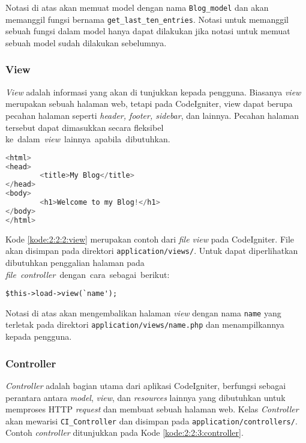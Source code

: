 Notasi di atas akan memuat model dengan nama \verb|Blog_model| dan akan memanggil fungsi bernama \verb|get_last_ten_entries|. Notasi untuk memanggil sebuah fungsi dalam model hanya dapat dilakukan jika notasi untuk memuat sebuah model sudah dilakukan sebelumnya.

\subsubsection{View}
\label{sub:2:2:2:View}

\textit{View} adalah informasi yang akan di tunjukkan kepada pengguna. Biasanya \textit{view} merupakan sebuah halaman web, tetapi pada CodeIgniter, view dapat berupa pecahan halaman seperti \textit{header, footer, sidebar}, dan lainnya. Pecahan halaman tersebut dapat dimasukkan secara fleksibel \mbox{ke dalam \textit{view} lainnya apabila dibutuhkan.}

\begin{lstlisting}[language=php, caption={Contoh \textit{view}}, label={kode:2:2:2:view}]
<html>
<head>
        <title>My Blog</title>
</head>
<body>
        <h1>Welcome to my Blog!</h1>
</body>
</html>
\end{lstlisting}

Kode \ref{kode:2:2:2:view} merupakan contoh dari \textit{file view} pada CodeIgniter. File akan disimpan pada direktori \verb|application/views/|. Untuk dapat diperlihatkan dibutuhkan penggalian halaman pada \mbox{\textit{file controller} dengan cara sebagai berikut:}

\begin{center}
	\verb|$this->load->view(`name');|
\end{center}

Notasi di atas akan mengembalikan halaman \textit{view} dengan nama \verb|name| yang terletak pada direktori \verb|application/views/name.php| dan menampilkannya kepada pengguna.

\subsubsection{Controller}
\label{sub:2:2:3:Controller}

\textit{Controller} adalah bagian utama dari aplikasi CodeIgniter, berfungsi sebagai perantara antara \textit{model}, \textit{view}, dan \textit{resources} lainnya yang dibutuhkan untuk memproses HTTP \textit{request} dan membuat sebuah halaman web. Kelas \textit{Controller} akan mewarisi \verb|CI_Controller| dan disimpan pada \verb|application/controllers/|. Contoh \textit{controller} ditunjukkan pada Kode \ref{kode:2:2:3:controller}.

